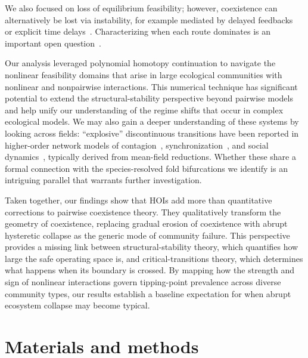 \documentclass[
 reprint,
 amsmath,
 amssymb,
 aps,
 superscriptaddress,
]{revtex4-2}
\begin{document}
We also focused on loss of equilibrium feasibility; however, coexistence can alternatively be lost via instability, for example mediated by delayed feedbacks~\cite{lever_five_2023} or explicit time delays~\cite{yang_catalysts_2026}. Characterizing when each route dominates is an important open question~\cite{lechon-alonso_robust_2026}.

Our analysis leveraged polynomial homotopy continuation to navigate the nonlinear feasibility domains that arise in large ecological communities with nonlinear and nonpairwise interactions. This numerical technique has significant potential to extend the structural-stability perspective beyond pairwise models and help unify our understanding of the regime shifts that occur in complex ecological models. We may also gain a deeper understanding of these systems by looking across fields: ``explosive'' discontinuous transitions have been reported in higher-order network models of contagion~\cite{ferraz_de_arruda_contagion_2024, iacopini_simplicial_2019}, synchronization~\cite{millan_explosive_2020}, and social dynamics~\cite{neuhauser_multibody_2020}, typically derived from mean-field reductions. Whether these share a formal connection with the species-resolved fold bifurcations we identify is an intriguing parallel that warrants further investigation.
 
Taken together, our findings show that HOIs add more than quantitative corrections to pairwise coexistence theory. They qualitatively transform the geometry of coexistence, replacing gradual erosion of coexistence with abrupt hysteretic collapse as the generic mode of community failure. This perspective provides a missing link between structural-stability theory, which quantifies how large the safe operating space is, and critical-transitions theory, which determines what happens when its boundary is crossed. By mapping how the strength and sign of nonlinear interactions govern tipping-point prevalence across diverse community types, our results establish a baseline expectation for when abrupt ecosystem collapse may become typical.  

\section*{Materials and methods}
 
\end{document}
